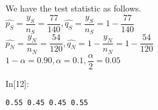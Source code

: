 \documentclass[float=false,crop=false]{standalone}
\begin{document}
We have the test statistic as follows.\\
\(\hat{p_S} = \dfrac{y_S}{n_S} = \dfrac{77}{140}, \hat{q_S} = \dfrac{y_S}{n_S} = 1 - \dfrac{77}{140}\)\\
\(\hat{p_N} = \dfrac{y_N}{n_N} = \dfrac{54}{120}, \hat{q_N} = 1 - \dfrac{y_N}{n_N} = 1 - \dfrac{54}{120}\)\\
\(1 - \alpha = 0.90, \alpha = 0.1, \dfrac{\alpha}{2} = 0.05\)
\begin{InVerbatim}[commandchars=\\\{\},fontsize=\scriptsize]
{\color{incolor}In[{\color{incolor}12}]:}   \PY{p}{[}   \PY{p}{]}
           \PY{p}{[}      \PY{p}{]}
           \PY{p}{[}    \PY{p}{]}
         \PY{p}{[}   \PY{p}{]}  
            
\end{InVerbatim}
    \begin{Verbatim}[commandchars=\\\{\},fontsize=\footnotesize]
0.55 0.45 0.45 0.55

    \end{Verbatim}
\end{document}
